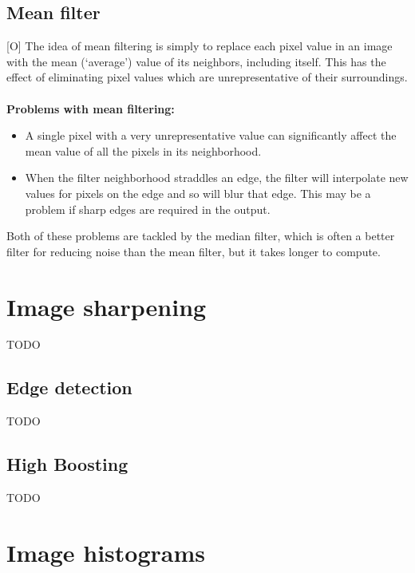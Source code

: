 \documentclass[12pt]{article}
\begin{document}
	\subsection{Mean filter}
	[O] The idea of mean filtering is simply to replace each pixel value in an image with the 
	mean (`average') value of its neighbors, including itself. This has the effect of eliminating 
	pixel values which are unrepresentative of their surroundings.\\
	\\	
	\textbf{Problems with mean filtering:}
	\begin{itemize}
		\item A single pixel with a very unrepresentative value can significantly affect 
		the mean value of all the pixels in its neighborhood. 
		\item When the filter neighborhood straddles an edge, the filter will interpolate 
		new values for pixels on the edge and so will blur that edge. This may be a problem
		if sharp edges are required in the output. 
	\end{itemize}
	Both of these problems are tackled by the median filter, which is often a better filter 
	for reducing noise than the mean filter, but it takes longer to compute. 
%	
%	
\section{Image sharpening}
	TODO
	\subsection{Edge detection}
	TODO
	\subsection{High Boosting}
	TODO	
%	
%	
\section{Image histograms}
\end{document}
